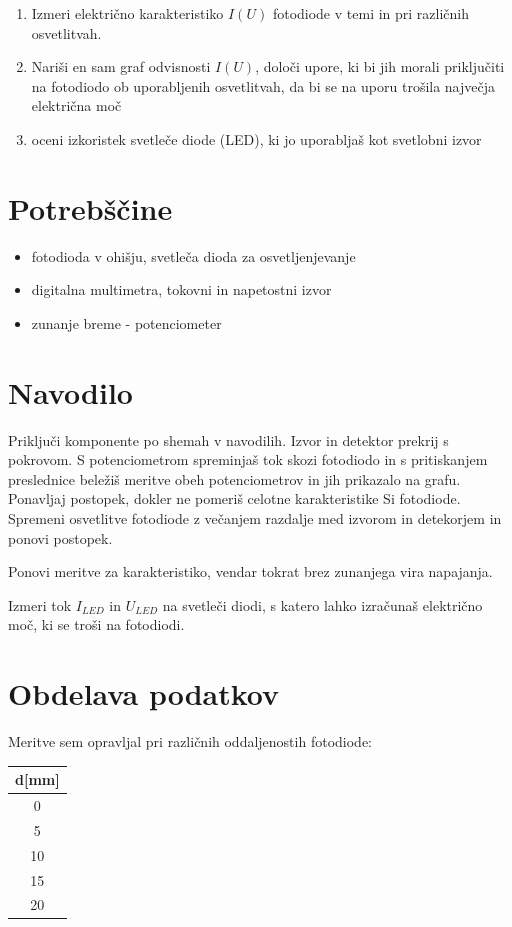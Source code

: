 \documentclass[12pt]{report}
\begin{document}
\begin{enumerate}
  \item Izmeri električno karakteristiko $I(U)$ fotodiode v temi in pri različnih osvetlitvah.
  \item Nariši en sam graf odvisnosti $I(U)$, določi upore, ki bi jih morali priključiti na fotodiodo ob uporabljenih osvetlitvah, da bi se na uporu trošila največja električna moč 
  \item oceni izkoristek svetleče diode (LED), ki jo uporabljaš kot svetlobni izvor 
\end{enumerate}

\begingroup
\let\clearpage\relax

\chapter*{Potrebščine}
\begin{itemize}
  \item fotodioda v ohišju, svetleča dioda za osvetljenjevanje
  \item digitalna multimetra, tokovni in napetostni izvor 
  \item zunanje breme - potenciometer
\end{itemize}

\chapter*{Navodilo}
Priključi komponente po shemah v navodilih. Izvor in detektor prekrij s pokrovom. S potenciometrom spreminjaš tok skozi fotodiodo in s pritiskanjem preslednice beležiš meritve obeh potenciometrov in jih prikazalo na grafu. Ponavljaj postopek, dokler ne pomeriš celotne karakteristike Si fotodiode. Spremeni osvetlitve fotodiode z večanjem razdalje med izvorom in detekorjem in ponovi postopek. 

Ponovi meritve za karakteristiko, vendar tokrat brez zunanjega vira napajanja. 

Izmeri tok $I_{LED}$ in $U_{LED}$ na svetleči diodi, s katero lahko izračunaš električno moč, ki se troši na fotodiodi. 
\endgroup


\chapter*{Obdelava podatkov}

Meritve sem opravljal pri različnih oddaljenostih fotodiode: 

\begin{tabela}[H]
  \centering
  \begin{tabular}{|c|}\hline
    d[mm] \\ \hline
    0 \\
    5 \\ 
    10 \\
    15 \\
    20 \\
    \hline
  \end{tabular}
\end{tabela}
\end{document}
